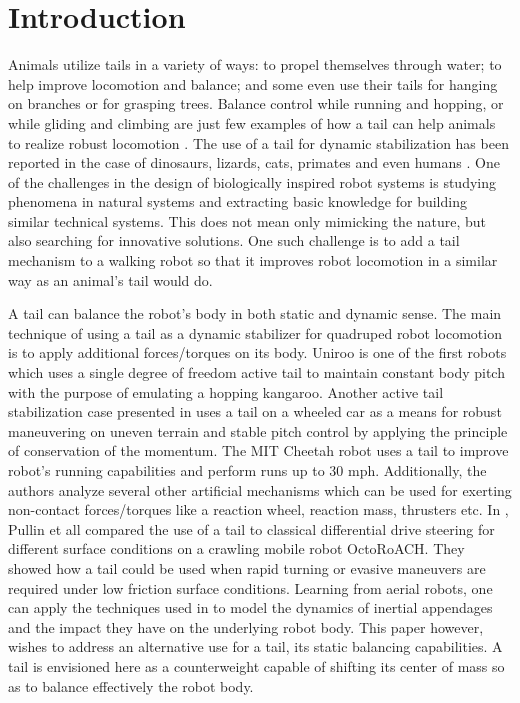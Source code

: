 \section{Introduction}\label{sec:introduction}

Animals utilize tails in a variety of ways: to propel themselves through water; to help improve locomotion and balance; and some even use their tails for hanging on branches or for grasping trees. Balance control while running and hopping, or while gliding and climbing are just few examples of how a tail can help animals to realize robust locomotion \cite{Thomas:Nature2012}. The use of a tail for dynamic stabilization has been reported in the case of dinosaurs, lizards, cats, primates and even humans \cite{ostrom1969osteology,PijnappelsSringer,Walker199841,JusufiIOP2010}. One of the challenges in the design of biologically inspired robot systems is studying phenomena in natural systems and extracting basic knowledge for building similar technical systems. This does not mean only mimicking the nature, but also searching for innovative solutions. One such challenge is to add a tail mechanism to a walking robot so that it improves robot locomotion in a similar way as an animal's tail would do. 
 
A tail can balance the robot's body in both static and dynamic sense. The main technique of using a tail as a dynamic stabilizer for quadruped robot locomotion is to apply additional forces/torques on its body. Uniroo \cite{zeglin1991uniroo} is one of the first robots which uses a single degree of freedom active tail to maintain constant body pitch with the purpose of emulating a hopping kangaroo. Another active tail stabilization case presented in \cite{conf/iros/Chang-SiuLTF11} uses a tail on a wheeled car as a means for robust maneuvering on uneven terrain and stable pitch control by applying the principle of conservation of the momentum. The MIT Cheetah robot \cite{DBLP:conf/iros/BriggsLHK12} uses a tail to improve robot's running capabilities and perform runs up to 30 mph. Additionally, the authors analyze several other artificial mechanisms which can be used for exerting non-contact forces/torques like a reaction wheel, reaction mass, thrusters etc. In \cite{PullinICRA12}, Pullin et all compared the use of a tail to classical differential drive steering for different surface conditions on a crawling mobile robot OctoRoACH. They showed how a tail could be used when rapid turning or evasive maneuvers are required under low friction surface conditions. Learning from aerial robots, one can apply the techniques used in \cite{Korpela2013ICRA,Orsag2012JINT} to model the dynamics of inertial appendages and the impact they have on the underlying robot body. This paper however, wishes to address an alternative use for a tail, its static balancing capabilities. A tail is envisioned here as a counterweight capable of shifting its center of mass so as to balance effectively the robot body.
 
